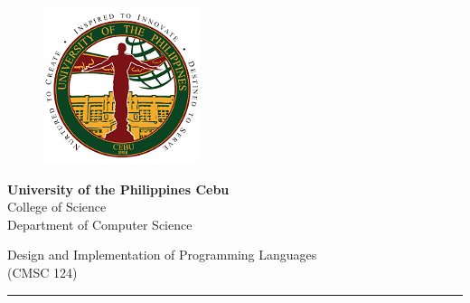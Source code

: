 \documentclass{article}
\begin{document}

\thispagestyle{empty}

\begin{center}
    \begin{figure}
        \centering
        \includegraphics[scale=0.5]{UP-Cebu-Logo}
    \end{figure}

    \textbf{University of the Philippines Cebu}\\
    College of Science\\
    Department of Computer Science\\
    \par
    \bigskip
    Design and Implementation of Programming Languages\\
    (CMSC 124)

\rule{\textwidth}{0.4pt}
\vfill


\end{center}
\end{document}
